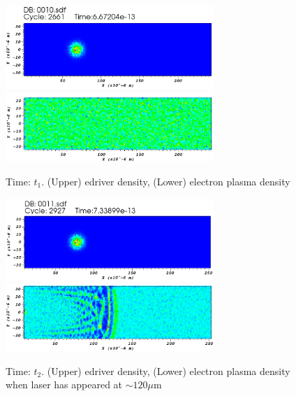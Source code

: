 \documentclass[%
onecolumn, notitlepage,
 amsmath,amssymb,
 aps,
]{article}
\begin{document}
\clearpage

\begin{figure}[!ht]
\centering
\includegraphics[width=0.7\textwidth]{buncht1copy.png}\\
\includegraphics[width=0.7\textwidth]{lasert1copy.png}
\caption{Time: $t_1$. (Upper) edriver density, (Lower) electron plasma density}
\vspace{-10pt}
\end{figure}
\begin{figure}[!ht]
\centering
\includegraphics[width=0.7\textwidth]{buncht2copy.png}\\
\includegraphics[width=0.7\textwidth]{lasert2copy.png}
\caption{Time: $t_2$. (Upper) edriver density, (Lower) electron plasma density when laser has appeared at $\sim 120 \mu$m}
\end{figure}












\clearpage
 \vfill
 
 


 
\end{document}
